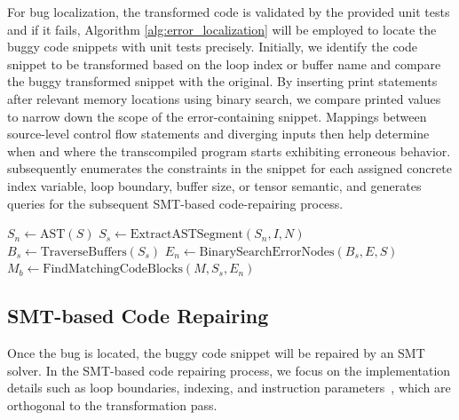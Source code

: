 For bug localization, the transformed code is validated by the provided unit tests and if it fails, 
Algorithm \ref{alg:error_localization} will be employed to locate the buggy code snippets with unit tests precisely. Initially, we identify the code snippet to be transformed based on the loop index or buffer name and compare the buggy transformed snippet with the original. By inserting print statements after relevant memory locations using binary search, we compare printed values to narrow down the scope of the error-containing snippet. Mappings between source-level control flow statements and diverging inputs then help determine when and where the transcompiled program starts exhibiting erroneous behavior. \name{} subsequently enumerates the constraints in the snippet for each assigned concrete index variable, loop boundary, buffer size, or tensor semantic, and generates queries for the subsequent SMT-based code-repairing process. 


\begin{algorithm}[h]
\scriptsize
\SetAlgoLined
\DontPrintSemicolon
{}

$S_{n} \gets \text{AST}(S)$ \; 
$S_{s} \gets \text{ExtractASTSegment}(S_{n}, I, N)$ \;
 \;
$B_{s} \gets \text{TraverseBuffers}(S_{s})$ \;
$E_{n} \gets \text{BinarySearchErrorNodes}(B_{s}, E, S)$ \;
$M_{b} \gets \text{FindMatchingCodeBlocks}(M, S_{s}, E_{n})$ \; 
\caption{Bug Localization Algorithm}
\label{alg:error_localization}
\end{algorithm}


\subsection{SMT-based Code Repairing}
Once the bug is located, the buggy code snippet will be repaired by an SMT solver. 
In the SMT-based code repairing process, we focus on the implementation details such as loop boundaries, indexing, and instruction parameters~\cite{DBLP:conf/ecoop/QiuCBHSC24}, which are orthogonal to the transformation pass.

